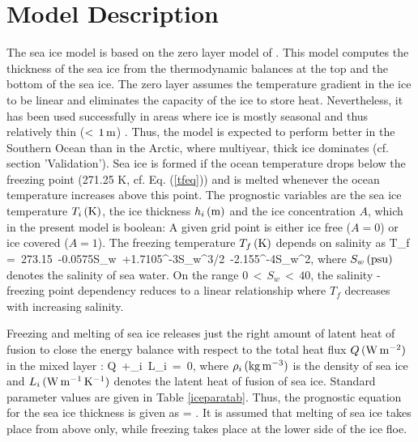 \chapter{Model Description}
The sea ice model is based on the zero layer model of
 \cite{semtner1976}. This model
 computes the thickness of the sea ice from the thermodynamic
 balances at the top and the bottom of the sea ice.
 The zero layer assumes the temperature gradient in the ice to
 be linear and eliminates the capacity of the ice to store heat.
 Nevertheless, it has been used successfully in areas where ice
 is mostly seasonal and thus relatively thin ($\rm <\, 1\, m$)
 \cite{beckmann2001}.
 Thus, the model is expected to perform better in the Southern
 Ocean than in the Arctic, where multiyear, thick ice dominates
 (cf. section 'Validation'). Sea ice is formed if the ocean
 temperature drops below the freezing point
 (271.25 K, cf. Eq. (\ref{tfeq})) and is melted whenever the
 ocean temperature increases above this point. The prognostic
 variables are the sea ice temperature $T_i\, \rm (K)$, the ice
 thickness $h_i \, \rm (m)$ and the ice concentration $A$, which
 in the present model is boolean: A given grid point is either
 ice free ($A=0$) or ice covered ($A=1$). The freezing
 temperature $T_f\, \rm(K)$ depends on salinity as
 \cite{unesco1978}
\be
T_f\, =\, 273.15\, -0.0575S_w\, +1.7105^{-3}S_w^{3/2}\, -2.155^{-4}S_w^2,
\label{tfeq}
\ee
where $S_w\,\rm(psu)$ denotes the salinity of sea water.
 On the range $0 \,<\, S_w \,<\, 40$, the salinity
 - freezing point dependency reduces to a linear relationship
 where $T_f$ decreases with increasing salinity.

Freezing and melting of sea ice releases just the right amount of latent heat 
of fusion to close the energy balance with respect to the total heat flux
$Q \, \rm (W\, m^{-2})$ in the mixed layer \cite{parkinson1979}:
\be
Q\, +\rho_i\, L_i\,  =\, 0,
\label{hieq}
\ee
where $\rho_i\, \rm (kg\, m^{-3})$ is the density of sea ice
 and $L_i\, \rm (W\, m^{-1}\, K^{-1})$ denotes the latent heat
 of fusion of sea ice. Standard parameter values are given in
 Table \ref{iceparatab}. \cite{parkinson1979} Thus, the prognostic
 equation for the sea ice thickness is given as
\be
{\di {} = .}
\label{hi_eq}
\ee
It is assumed that melting of sea ice takes place from above only, while 
freezing takes place at the lower side of the ice floe.

